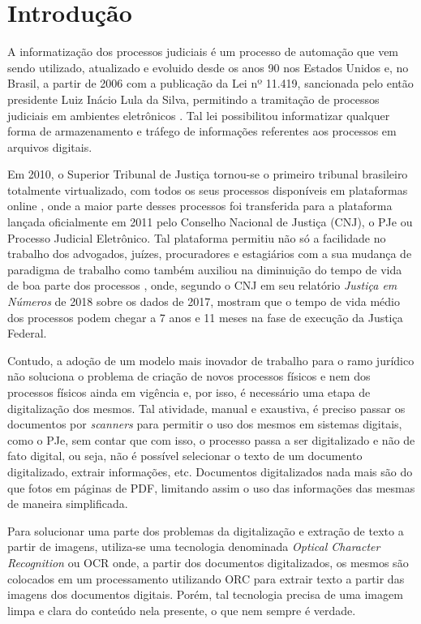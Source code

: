 \chapter[Introdução]{Introdução}

A informatização dos processos judiciais é um processo de automação que vem sendo utilizado, atualizado e evoluido desde os anos 90 nos Estados Unidos \cite{automating-judicial-doc} e, no Brasil, a partir de 2006 com a publicação da Lei nº 11.419, sancionada pelo então presidente Luiz Inácio Lula da Silva, permitindo a tramitação de processos judiciais em ambientes eletrônicos \cite{digitalizacao-de-proc-judiciais}. Tal lei possibilitou informatizar qualquer forma de armazenamento e tráfego de informações referentes aos processos em arquivos digitais.

Em 2010, o Superior Tribunal de Justiça tornou-se o primeiro tribunal brasileiro totalmente virtualizado, com todos os seus processos disponíveis em plataformas online \cite{digitalizacao-de-proc-judiciais}, onde a maior parte desses processos foi transferida para a plataforma lançada oficialmente em 2011 pelo Conselho Nacional de Justiça (CNJ), o PJe ou Processo Judicial Eletrônico. Tal plataforma permitiu não só a facilidade no trabalho dos advogados, juízes, procuradores e estagiários com a sua mudança de paradigma de trabalho como também auxiliou na diminuição do tempo de vida de boa parte dos processos \cite{pje-diminuicao-tempo-do=proc}, onde, segundo o CNJ em seu relatório \textit{Justiça em Números} de 2018 sobre os dados de 2017, mostram que o tempo de vida médio dos processos podem chegar a 7 anos e 11 meses na fase de execução da Justiça Federal.

Contudo, a adoção de um modelo mais inovador de trabalho para o ramo jurídico não soluciona o problema de criação de novos processos físicos e nem dos processos físicos ainda em vigência e, por isso, é necessário uma etapa de digitalização dos mesmos. Tal atividade, manual e exaustiva, é preciso passar os documentos por \textit{scanners} para permitir o uso dos mesmos em sistemas digitais, como o PJe, sem contar que com isso, o processo passa a ser digitalizado e não de fato digital, ou seja, não é possível selecionar o texto de um documento digitalizado, extrair informações, etc. Documentos digitalizados nada mais são do que fotos em páginas de PDF, limitando assim o uso das informações das mesmas de maneira simplificada.

Para solucionar uma parte dos problemas da digitalização e extração de texto a partir de imagens, utiliza-se uma tecnologia denominada \textit{Optical Character Recognition} ou OCR onde, a partir dos documentos digitalizados, os mesmos são colocados em um processamento utilizando ORC para extrair texto a partir das imagens dos documentos digitais. Porém, tal tecnologia precisa de uma imagem limpa e clara do conteúdo nela presente, o que nem sempre é verdade.

